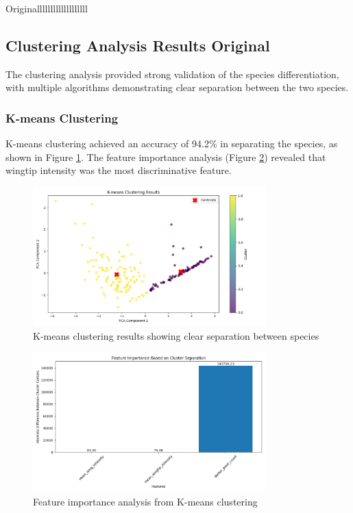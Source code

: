 \documentclass[a4paper,12pt]{report}
\begin{document}
Originalllllllllllllllllll

\subsection{Clustering Analysis Results Original}

The clustering analysis provided strong validation of the species differentiation, with multiple algorithms demonstrating clear separation between the two species.

\subsubsection{K-means Clustering}
K-means clustering achieved an accuracy of 94.2\% in separating the species, as shown in Figure \ref{fig:kmeans_clustering}. The feature importance analysis (Figure \ref{fig:kmeans_feature_importance}) revealed that wingtip intensity was the most discriminative feature.

\begin{figure}[H]
    \centering
    \includegraphics[width=0.8\textwidth]{images/clustering/kmeans_clustering.png}
    \caption{K-means clustering results showing clear separation between species}
    \label{fig:kmeans_clustering}
\end{figure}

\begin{figure}[H]
    \centering
    \includegraphics[width=0.8\textwidth]{images/clustering/kmeans_feature_importance.png}
    \caption{Feature importance analysis from K-means clustering}
    \label{fig:kmeans_feature_importance}
\end{figure}
\end{document}
